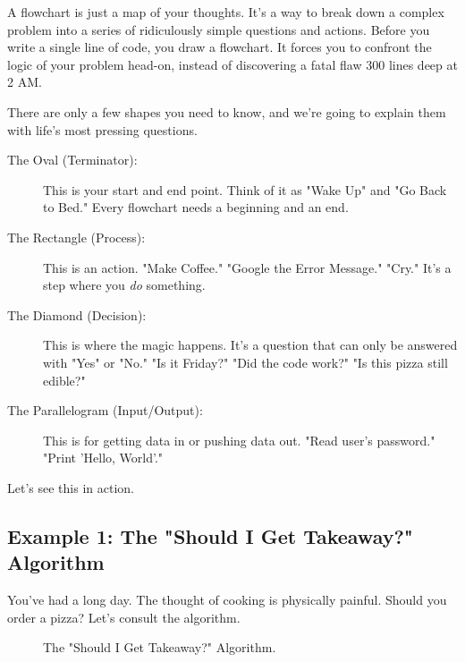 \documentclass[11pt, letterpaper, openany]{book}
\begin{document}
A flowchart is just a map of your thoughts. It's a way to break down a complex problem into a series of ridiculously simple questions and actions. Before you write a single line of code, you draw a flowchart. It forces you to confront the logic of your problem head-on, instead of discovering a fatal flaw 300 lines deep at 2 AM.

There are only a few shapes you need to know, and we're going to explain them with life's most pressing questions.

\begin{description}
    \item[The Oval (Terminator):] This is your start and end point. Think of it as "Wake Up" and "Go Back to Bed." Every flowchart needs a beginning and an end.
    \item[The Rectangle (Process):] This is an action. "Make Coffee." "Google the Error Message." "Cry." It's a step where you \emph{do} something.
    \item[The Diamond (Decision):] This is where the magic happens. It's a question that can only be answered with "Yes" or "No." "Is it Friday?" "Did the code work?" "Is this pizza still edible?"
    \item[The Parallelogram (Input/Output):] This is for getting data in or pushing data out. "Read user's password." "Print 'Hello, World'."
\end{description}

Let's see this in action.

\subsection{Example 1: The "Should I Get Takeaway?" Algorithm}

You've had a long day. The thought of cooking is physically painful. Should you order a pizza? Let's consult the algorithm.

\begin{figure}[h!]
\centering
{}
\caption{The "Should I Get Takeaway?" Algorithm.}
\end{figure}
\end{document}
